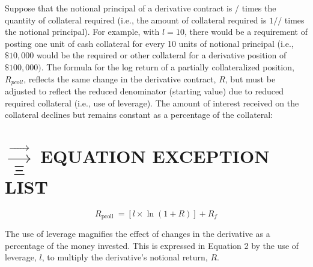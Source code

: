 \documentclass[11pt]{article}
\begin{document}
Suppose that the notional principal of a derivative contract is / times the quantity of collateral required (i.e., the amount of collateral required is $1 / /$ times the notional principal). For example, with $l=10$, there would be a requirement of posting one unit of cash collateral for every 10 units of notional principal (i.e., $\$ 10,000$ would be the required or other collateral for a derivative position of $\$ 100,000)$. The formula for the log return of a partially collateralized position, $R_{p c o l l}$, reflects the same change in the derivative contract, $R$, but must be adjusted to reflect the reduced denominator (starting value) due to reduced required collateral (i.e., use of leverage). The amount of interest received on the collateral declines but remains constant as a percentage of the collateral:

\section*{$\xrightarrow[\text { 三 }]{\longrightarrow}$ EQUATION EXCEPTION LIST}

\begin{equation*}
R_{\text {pcoll }}=[l \times \ln (1+R)]+R_{f} \tag{2}
\end{equation*}


The use of leverage magnifies the effect of changes in the derivative as a percentage of the money invested. This is expressed in Equation 2 by the use of leverage, $l$, to multiply the derivative's notional return, $R$.
\end{document}
